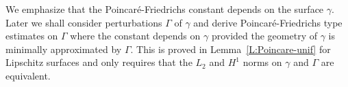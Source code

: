 
We emphasize that the Poincar\'e-Friedrichs constant depends on the surface $\gamma$. 
Later we shall consider perturbations $\Gamma$ of $\gamma$ and derive Poincar\'e-Friedrichs type estimates on $\Gamma$ where the constant depends on $\gamma$ provided the geometry of $\gamma$ is minimally approximated by $\Gamma$. This is proved in Lemma~\ref{L:Poincare-unif} for Lipschitz surfaces and only requires that the $L_2$ and $H^1$ norms on $\gamma$ and $\Gamma$ are equivalent.

